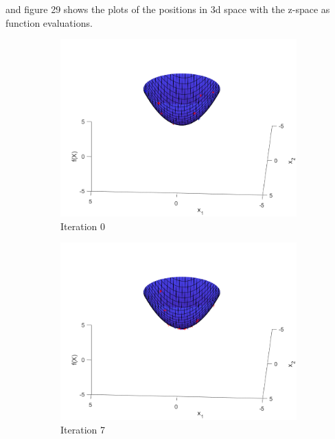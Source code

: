 and figure 29 shows the plots of the positions in 3d space with the z-space as function evaluations.

\begin{figure}
  \begin{subfigure}[b]{0.4\textwidth}
    \includegraphics[width=\textwidth]{img/smpl/sphr/loa-iter-0}
    \caption{Iteration 0}
    \label{fig:s2-iter-0}
  \end{subfigure}
  \begin{subfigure}[b]{0.4\textwidth}
    \includegraphics[width=\textwidth]{img/smpl/sphr/loa-iter-7}
    \caption{Iteration 7}
    \label{fig:s2-iter-1}
  \end{subfigure}
  \begin{subfigure}[b]{0.4\textwidth}

\end{subfigure}
\end{figure}
